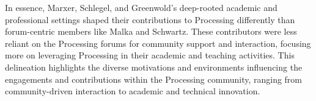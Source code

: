 In essence, Marxer, Schlegel, and Greenwold's deep-rooted academic and professional settings shaped their contributions to Processing differently than forum-centric members like Malka and Schwartz. These contributors were less reliant on the Processing forums for community support and interaction, focusing more on leveraging Processing in their academic and teaching activities. This delineation highlights the diverse motivations and environments influencing the engagements and contributions within the Processing community, ranging from community-driven interaction to academic and technical innovation.

